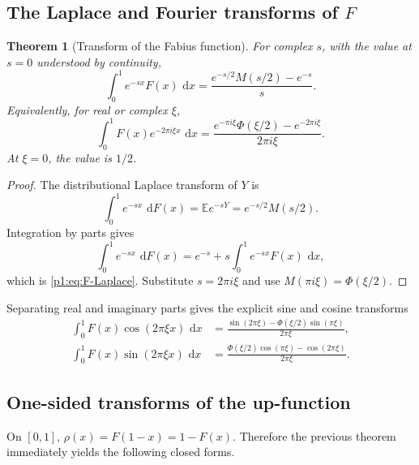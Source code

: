 \documentclass[11pt]{article}
\newtheorem{theorem}{Theorem}[section]
\theoremstyle{definition}
\theoremstyle{remark}
\newcommand{\E}{\mathbb E}
\newcommand{\dd}{\,\mathrm d}
\begin{document}
\subsection{The Laplace and Fourier transforms of \(F\)}

\begin{theorem}[Transform of the Fabius function]\label{p1:thm:F-transform}
For complex \(s\), with the value at \(s=0\) understood by continuity,
\begin{equation}
 \boxed{
 \int_0^1 e^{-sx}F(x)\,\dd x
 =\frac{e^{-s/2}M(s/2)-e^{-s}}{s}.
 }                                                           \label{p1:eq:F-Laplace}
\end{equation}
Equivalently, for real or complex \(\xi\),
\begin{equation}
 \boxed{
 \int_0^1F(x)e^{-2\pi i\xi x}\,\dd x
 =\frac{e^{-\pi i\xi}\Phi(\xi/2)-e^{-2\pi i\xi}}{2\pi i\xi}.
 }                                                           \label{p1:eq:F-Fourier}
\end{equation}
At \(\xi=0\), the value is \(1/2\).
\end{theorem}

\begin{proof}
The distributional Laplace transform of \(Y\) is
\begin{equation}
 \int_0^1 e^{-sx}\,\dd F(x)=\E e^{-sY}=e^{-s/2}M(s/2).       \label{p1:eq:dF-Laplace}
\end{equation}
Integration by parts gives
\[
 \int_0^1e^{-sx}\,\dd F(x)
 =e^{-s}+s\int_0^1e^{-sx}F(x)\,\dd x,
\]
which is \eqref{p1:eq:F-Laplace}.  Substitute \(s=2\pi i\xi\) and use
\(M(\pi i\xi)=\Phi(\xi/2)\).
\end{proof}

Separating real and imaginary parts gives the explicit sine and cosine transforms
\begin{align}
 \int_0^1F(x)\cos(2\pi\xi x)\,\dd x
 &=\frac{\sin(2\pi\xi)-\Phi(\xi/2)\sin(\pi\xi)}{2\pi\xi},    \label{p1:eq:F-cosine-transform}\\
 \int_0^1F(x)\sin(2\pi\xi x)\,\dd x
 &=\frac{\Phi(\xi/2)\cos(\pi\xi)-\cos(2\pi\xi)}{2\pi\xi}. \label{p1:eq:F-sine-transform}
\end{align}

\subsection{One-sided transforms of the up-function}

On \([0,1]\), \(\rho(x)=F(1-x)=1-F(x)\).  Therefore the previous theorem immediately
yields the following closed forms.
\end{document}
